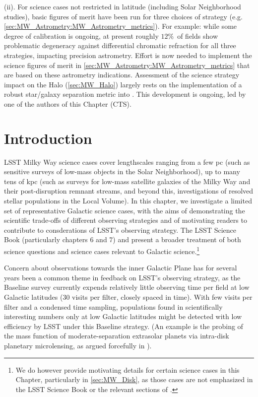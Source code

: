 (ii). For science cases not restricted in latitude (including Solar
Neighborhood studies), basic figures of merit have been run for three choices of strategy (e.g. \autoref{sec:MW_Astrometry:MW_Astrometry_metrics}). For example: while some degree of
calibration is ongoing, at present roughly $12\%$~of fields show
problematic degeneracy against differential chromatic refraction for
all three strategies, impacting precision astrometry. Effort is now needed to implement the science
figures of merit in \autoref{sec:MW_Astrometry:MW_Astrometry_metrics} that are based on these
astrometry indications. Assessment of the science strategy impact on
the Halo (\autoref{sec:MW_Halo}) largely rests on the
implementation of a robust star/galaxy separation metric into \MAF.
This development is ongoing, led by one of the authors of this Chapter
(CTS).

\section{Introduction}

\def\secname{MW_Intro}\label{sec:\secname}


LSST Milky Way science cases cover lengthscales
ranging from a few pc (such as sensitive surveys of low-mass objects in
the Solar Neighborhood), up to many tens of kpc (such as surveys for
low-mass satellite galaxies of the Milky Way and their post-disruption
remnant streams, and beyond this, investigations of resolved stellar
populations in the Local Volume). In this chapter, we investigate a limited set of representative Galactic science cases, with the aims of demonstrating the scientific trade-offs of different observing strategies and of motivating readers to contribute to consderations of LSST's observing strategy.  The LSST Science Book
(particularly chapters 6 and 7) and \citet[][in particular Sections
2.1.4 and 4.4]{IvezicEtal2008} present a broader treatment of both science questions and science cases relevant to Galactic science.\footnote{We do however provide
motivating details for certain science cases in this Chapter,
particularly in \autoref{sec:MW_Disk}, as those cases are not
emphasized in the LSST Science Book or the relevant sections of
\citet{IvezicEtal2008}.}

Concern about observations towards the inner Galactic Plane has for
several years been a common theme in feedback on LSST's observing
strategy, as the Baseline survey currently expends relatively little
observing time per field at low Galactic latitudes (30 visits per filter, closely spaced in time).  With few visits per filter and a condensed time sampling, populations found in scientifically interesting numbers only at low
Galactic latitudes might be detected with low efficiency
by LSST under this Baseline strategy. (An example is the probing of the
mass function of moderate-separation extrasolar planets via intra-disk
planetary microlensing, as argued forcefully in \citealt{gould13}).

